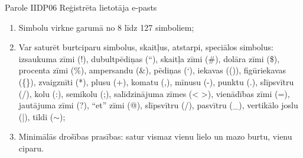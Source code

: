 {Parole}
{IIDP06}
{
	Reģistrēta lietotāja e-pasts
}
{
	\begin{enumerate}
		\item Simbolu virkne garumā no 8 līdz 127 simboliem;
		\item Var saturēt burtciparu simbolus, skaitļus, atstarpi, speciālos simbolus:
		      izsaukuma zīmi (!), dubultpēdiņas (``), skaitļa zīmi (\#), dolāra zīmi (\$),
		      procenta zīmi (\%), ampersandu (\&), pēdiņas (`), iekavas (()), figūriekavas (\{\}), zvaigznīti (*),
		      plusu (+), komatu (,), mīnusu (-), punktu (.), slīpsvītru (/), kolu (:), semikolu (;),
		      salīdzinājuma zīmes (< >), vienādības zīmi (=), jautājuma zīmi (?), ``et'' zīmi (@),
		      slīpsvītru (/), pasvītru (\_), vertikālo joslu (|), tildi ($\sim$); %
		\item Minimālās drošības prasības: satur vismaz vienu lielo un mazo burtu, vienu ciparu.
	\end{enumerate}
}
{
}
